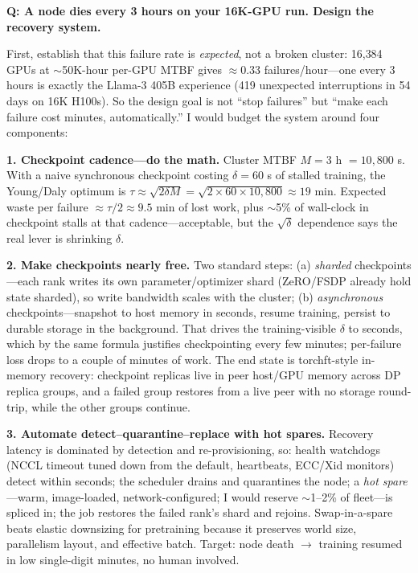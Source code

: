 \begin{interviewq}
\textbf{Q: A node dies every 3 hours on your 16K-GPU run. Design the recovery system.}

 \quad {} \quad \badgefreq{\freqhigh}

\stronganswer

First, establish that this failure rate is \emph{expected}, not a broken cluster: 16{,}384 GPUs at $\sim$50K-hour per-GPU MTBF gives $\approx 0.33$ failures/hour---one every 3 hours is exactly the Llama-3 405B experience (419 unexpected interruptions in 54 days on 16K H100s). So the design goal is not ``stop failures'' but ``make each failure cost minutes, automatically.'' I would budget the system around four components:

\textbf{1. Checkpoint cadence---do the math.} Cluster MTBF $M = 3$ h $= 10{,}800$ s. With a naive synchronous checkpoint costing $\delta = 60$ s of stalled training, the Young/Daly optimum is $\tau \approx \sqrt{2\delta M} = \sqrt{2 \times 60 \times 10{,}800} \approx 19$ min. Expected waste per failure $\approx \tau/2 \approx 9.5$ min of lost work, plus $\sim$5\% of wall-clock in checkpoint stalls at that cadence---acceptable, but the $\sqrt{\delta}$ dependence says the real lever is shrinking $\delta$.

\textbf{2. Make checkpoints nearly free.} Two standard steps: (a) \emph{sharded} checkpoints---each rank writes its own parameter/optimizer shard (ZeRO/FSDP already hold state sharded), so write bandwidth scales with the cluster; (b) \emph{asynchronous} checkpoints---snapshot to host memory in seconds, resume training, persist to durable storage in the background. That drives the training-visible $\delta$ to seconds, which by the same formula justifies checkpointing every few minutes; per-failure loss drops to a couple of minutes of work. The end state is torchft-style in-memory recovery: checkpoint replicas live in peer host/GPU memory across DP replica groups, and a failed group restores from a live peer with no storage round-trip, while the other groups continue.

\textbf{3. Automate detect--quarantine--replace with hot spares.} Recovery latency is dominated by detection and re-provisioning, so: health watchdogs (NCCL timeout tuned down from the default, heartbeats, ECC/Xid monitors) detect within seconds; the scheduler drains and quarantines the node; a \emph{hot spare}---warm, image-loaded, network-configured; I would reserve $\sim$1--2\% of fleet---is spliced in; the job restores the failed rank's shard and rejoins. Swap-in-a-spare beats elastic downsizing for pretraining because it preserves world size, parallelism layout, and effective batch. Target: node death $\to$ training resumed in low single-digit minutes, no human involved.


\end{interviewq}
